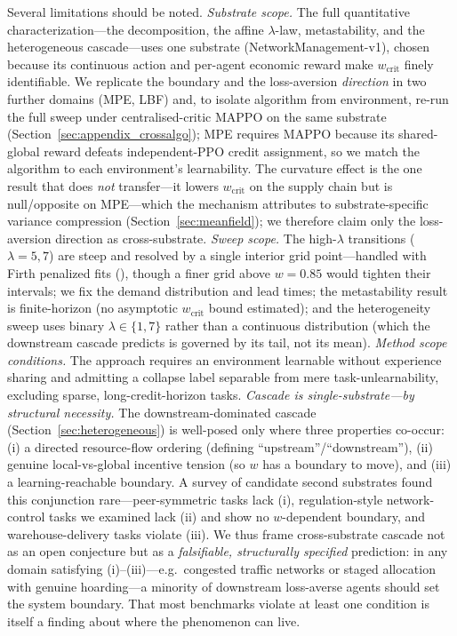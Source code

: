 \documentclass[letterpaper]{article}
\theoremstyle{plain}
\newcommand{\wcrit}{w_{\mathrm{crit}}}
\begin{document}
Several limitations should be noted.
\emph{Substrate scope.} The full quantitative characterization---the
decomposition, the affine $\lambda$-law, metastability, and the heterogeneous
cascade---uses one substrate (NetworkManagement-v1), chosen because its
continuous action and per-agent economic reward make $\wcrit$ finely
identifiable. We replicate the boundary and the loss-aversion \emph{direction}
in two further domains (MPE, LBF) and, to isolate algorithm from environment,
re-run the full sweep under centralised-critic MAPPO on the same substrate
(Section~\ref{sec:appendix_crossalgo}); MPE requires MAPPO because its
shared-global reward defeats independent-PPO credit assignment, so we match the
algorithm to each environment's learnability. The curvature effect is the one
result that does \emph{not} transfer---it lowers $\wcrit$ on the supply chain
but is null/opposite on MPE---which the mechanism attributes to
substrate-specific variance compression (Section~\ref{sec:meanfield}); we
therefore claim only the loss-aversion direction as cross-substrate.
\emph{Sweep scope.} The high-$\lambda$ transitions ($\lambda{=}5,7$) are steep
and resolved by a single interior grid point---handled with Firth penalized fits
(), though a finer grid above $w{=}0.85$ would tighten
their intervals; we fix the demand distribution and lead times; the metastability
result is finite-horizon (no asymptotic $\wcrit$ bound estimated); and the
heterogeneity sweep uses binary $\lambda\in\{1,7\}$ rather than a continuous
distribution (which the downstream cascade predicts is governed by its tail, not
its mean).
\emph{Method scope conditions.} The approach requires an environment learnable
without experience sharing and admitting a collapse label separable from mere
task-unlearnability, excluding sparse, long-credit-horizon tasks.
\emph{Cascade is single-substrate---by structural necessity.} The
downstream-dominated cascade (Section~\ref{sec:heterogeneous}) is well-posed only
where three properties co-occur: (i) a directed resource-flow ordering (defining
``upstream''/``downstream''), (ii) genuine local-vs-global incentive tension (so
$w$ has a boundary to move), and (iii) a learning-reachable boundary. A survey of
candidate second substrates found this conjunction rare---peer-symmetric tasks
lack (i), regulation-style network-control tasks we examined lack (ii) and show
no $w$-dependent boundary, and warehouse-delivery tasks violate (iii). We thus
frame cross-substrate cascade not as an open conjecture but as a \emph{falsifiable,
structurally specified} prediction: in any domain satisfying (i)--(iii)---e.g.\
congested traffic networks or staged allocation with genuine hoarding---a minority
of downstream loss-averse agents should set the system boundary. That most
benchmarks violate at least one condition is itself a finding about where the
phenomenon can live.
\end{document}
